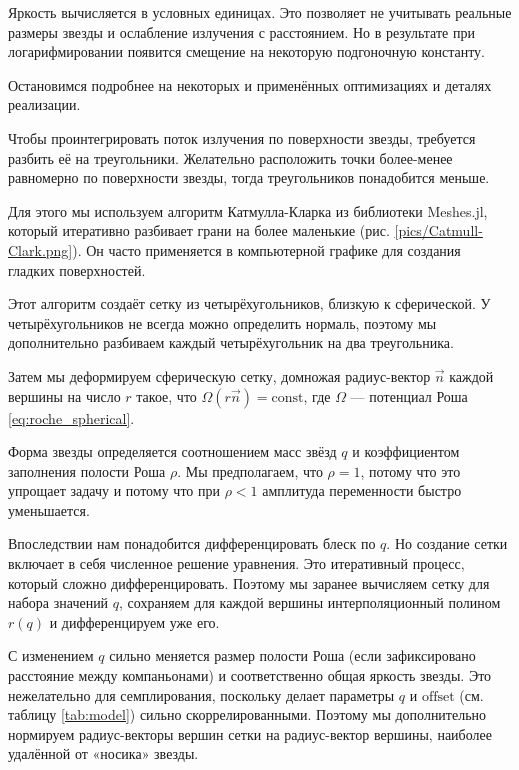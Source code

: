 Яркость вычисляется в условных единицах. Это позволяет не учитывать реальные размеры звезды и ослабление излучения с расстоянием. Но в результате при логарифмировании появится смещение на некоторую подгоночную константу.

Остановимся подробнее на некоторых и применённых оптимизациях и деталях реализации.


Чтобы проинтегрировать поток излучения по поверхности звезды, требуется разбить её на треугольники. Желательно расположить точки более-менее равномерно по поверхности звезды, тогда треугольников понадобится меньше.

Для этого мы используем алгоритм Катмулла-Кларка из библиотеки Meshes.jl, который итеративно разбивает грани на более маленькие (рис. \ref{pics/Catmull-Clark.png}). Он часто применяется в компьютерной графике для создания гладких поверхностей.


Этот алгоритм создаёт сетку из четырёхугольников, близкую к сферической. У четырёхугольников не всегда можно определить нормаль, поэтому мы дополнительно разбиваем каждый четырёхугольник на два треугольника.

Затем мы деформируем сферическую сетку, домножая радиус-вектор $\vec n$ каждой вершины на число $r$ такое, что $\Omega(r \vec n) = \text{const}$, где $\Omega$ --- потенциал Роша \eqref{eq:roche_spherical}.

Форма звезды определяется соотношением масс звёзд $q$ и коэффициентом заполнения полости Роша $\rho.$ Мы предполагаем, что $\rho = 1$, потому что это упрощает задачу и потому что при $\rho < 1$ амплитуда переменности быстро уменьшается.

Впоследствии нам понадобится дифференцировать блеск по $q$. Но создание сетки включает в себя численное решение уравнения. Это итеративный процесс, который сложно дифференцировать. Поэтому мы заранее вычисляем сетку для набора значений $q$, сохраняем для каждой вершины интерполяционный полином $r(q)$ и дифференцируем уже его.

С изменением $q$ сильно меняется размер полости Роша (если зафиксировано расстояние между компаньонами) и соответственно общая яркость звезды. Это нежелательно для семплирования, поскольку делает параметры $q$ и $\text{offset}$ (см. таблицу \ref{tab:model}) сильно скоррелированными. Поэтому мы дополнительно нормируем радиус-векторы вершин сетки на радиус-вектор вершины, наиболее удалённой от «носика» звезды.


